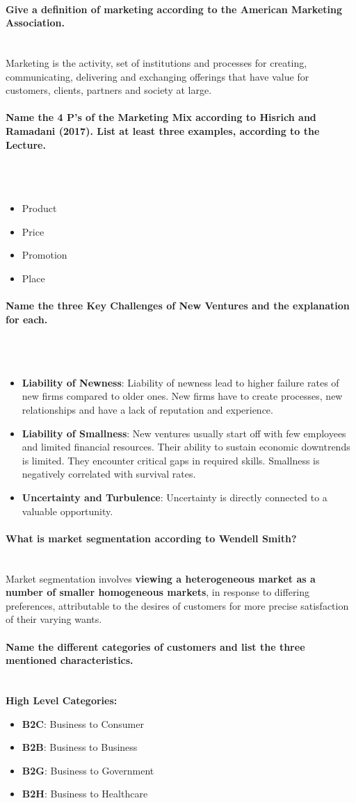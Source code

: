 \documentclass[10pt,a4paper,noendnumber=true]{scrartcl}
\newcommand{\properparagraph}[1]{\paragraph{\textcolor{Emerald}{#1}}\mbox{}\\}
\begin{document}
\properparagraph{Give a definition of marketing according to the American Marketing Association.}
Marketing is the activity, set of institutions and processes for creating, communicating, delivering and exchanging offerings that have value for customers, clients, partners and society at large.

\properparagraph{Name the 4 P’s of the Marketing Mix according to Hisrich and Ramadani (2017). List at least three examples, according to the Lecture.}
\\[-6ex]
\begin{itemize}
	\item Product
	\item Price
	\item Promotion
	\item Place
\end{itemize}

\properparagraph{Name the three Key Challenges of New Ventures and the explanation for each.}
\\[-6ex]
\begin{itemize}
	\item \textbf{Liability of Newness}: 
	Liability of newness lead to higher failure rates of new firms compared to older ones. New firms have to create processes, new relationships and have a lack of reputation and experience.
	\item \textbf{Liability of Smallness}:
	New ventures usually start off with few employees and limited financial resources. Their ability to sustain economic downtrends is limited. They encounter critical gaps in required skills. Smallness is negatively correlated with survival rates.
	\item \textbf{Uncertainty and Turbulence}:
	Uncertainty is directly connected to a valuable opportunity.
\end{itemize}

\properparagraph{What is market segmentation according to Wendell Smith?}
Market segmentation involves \textbf{viewing a heterogeneous market as a number of smaller homogeneous markets}, in response to differing preferences, attributable to the desires of customers for more precise satisfaction of their varying wants.

\properparagraph{Name the different categories of customers and list the three mentioned characteristics.}

\textbf{High Level Categories:}
\begin{itemize}
	\item \textbf{B2C}: Business to Consumer
	\item \textbf{B2B}: Business to Business
	\item \textbf{B2G}: Business to Government
	\item \textbf{B2H}: Business to Healthcare
\end{itemize}
\end{document}
